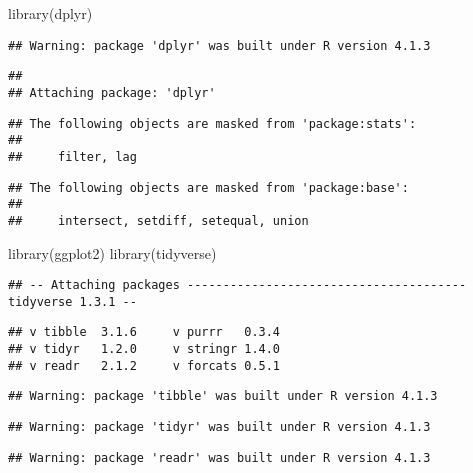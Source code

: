 \documentclass[
]{article}
\newenvironment{Shaded}{\begin{snugshade}}{\end{snugshade}}
\newcommand{\FunctionTok}[1]{\textcolor[rgb]{0.00,0.00,0.00}{#1}}
\newcommand{\NormalTok}[1]{#1}
\begin{document}
\begin{Shaded}
\begin{Highlighting}[]
\FunctionTok{library}\NormalTok{(dplyr)}
\end{Highlighting}
\end{Shaded}

\begin{verbatim}
## Warning: package 'dplyr' was built under R version 4.1.3
\end{verbatim}

\begin{verbatim}
## 
## Attaching package: 'dplyr'
\end{verbatim}

\begin{verbatim}
## The following objects are masked from 'package:stats':
## 
##     filter, lag
\end{verbatim}

\begin{verbatim}
## The following objects are masked from 'package:base':
## 
##     intersect, setdiff, setequal, union
\end{verbatim}

\begin{Shaded}
\begin{Highlighting}[]
\FunctionTok{library}\NormalTok{(ggplot2)}
\FunctionTok{library}\NormalTok{(tidyverse)}
\end{Highlighting}
\end{Shaded}

\begin{verbatim}
## -- Attaching packages --------------------------------------- tidyverse 1.3.1 --
\end{verbatim}

\begin{verbatim}
## v tibble  3.1.6     v purrr   0.3.4
## v tidyr   1.2.0     v stringr 1.4.0
## v readr   2.1.2     v forcats 0.5.1
\end{verbatim}

\begin{verbatim}
## Warning: package 'tibble' was built under R version 4.1.3
\end{verbatim}

\begin{verbatim}
## Warning: package 'tidyr' was built under R version 4.1.3
\end{verbatim}

\begin{verbatim}
## Warning: package 'readr' was built under R version 4.1.3
\end{verbatim}
\end{document}
